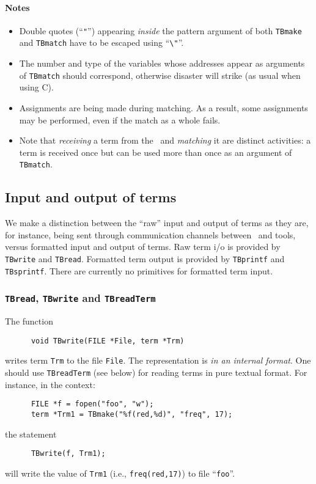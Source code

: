 \documentclass[a4,twoside,noweb]{article} %
\begin{document}
\paragraph{Notes}
\begin{itemize}
\item Double quotes (``{\tt "}'') appearing {\em inside} the pattern argument
of both {\tt TBmake} and {\tt TBmatch} have to be escaped using ``\verb-\"-''.
\item The number and type of the variables whose addresses appear
as arguments of {\tt TBmatch} should correspond, otherwise disaster
will strike (as usual when using C).
\item Assignments are being made during matching. As a result, some assignments
may be performed, even if the match as a whole fails.
\item Note that {\em receiving} a term from the \TB\ and {\em matching} it are distinct
activities: a term is received once but can be used more than once
as an argument of {\tt TBmatch}.
\end{itemize}

\subsection{\label{TermIO}Input and output of terms}
We make a distinction between the ``raw'' input and output of terms
as they are, for instance, being sent through communication
channels between \TB\ and tools, versus formatted input and output
of terms. Raw term i/o is provided by {\tt TBwrite} and {\tt TBread}.
Formatted term output is provided by {\tt TBprintf} and {\tt TBsprintf}.
There are currently no primitives for formatted term input.

\subsubsection{\label{TBread/write}{\tt TBread}, {\tt TBwrite} and {\tt TBreadTerm}}
The function
\begin{verbatim}
      void TBwrite(FILE *File, term *Trm)
\end{verbatim}
writes term {\tt Trm} to the file {\tt File}. The representation is
{\em in an internal format}. One should use {\tt TBreadTerm} (see below)
for reading terms in pure textual format.
For instance, in the context:
\begin{verbatim}
      FILE *f = fopen("foo", "w");
      term *Trm1 = TBmake("%f(red,%d)", "freq", 17);
\end{verbatim}
the statement
\begin{verbatim}
      TBwrite(f, Trm1);
\end{verbatim}
will write the value of {\tt Trm1} (i.e., {\tt freq(red,17)})
to file ``{\tt foo}''.
\end{document}
